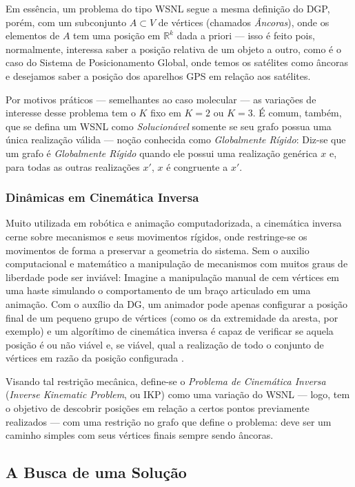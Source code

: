 Em essência, um problema do tipo WSNL segue a mesma definição do DGP, porém, com um subconjunto $A\subset V$ de vértices (chamados \textit{Âncoras}), onde os elementos de $A$ tem uma posição em $\mathbb{R}^k$ dada a priori --- isso é feito pois, normalmente, interessa saber a posição relativa de um objeto a outro, como é o caso do Sistema de Posicionamento Global, onde temos os satélites como âncoras e desejamos saber a posição dos aparelhos GPS em relação aos satélites.

Por motivos práticos --- semelhantes ao caso molecular --- as variações de interesse desse problema tem o $K$ fixo em $K= 2$ ou $K=3$. É comum, também, que se defina um WSNL como \textit{Solucionável} somente se seu grafo possua uma única realização válida --- noção conhecida como \textit{Globalmente Rígido}: Diz-se que um grafo é \textit{Globalmente Rígido} quando ele possui uma realização genérica $x$ e, para todas as outras realizações $x'$, $x$ é congruente a $x'$. 

\subsubsection{Dinâmicas em Cinemática Inversa}

Muito utilizada em robótica e animação computadorizada, a cinemática inversa cerne sobre mecanismos e seus movimentos rígidos, onde restringe-se os movimentos de forma a preservar a geometria do sistema. Sem o auxilio computacional e matemático a manipulação de mecanismos com muitos graus de liberdade  pode ser inviável: Imagine a manipulação manual de cem vértices em uma haste simulando o comportamento de um braço articulado em uma animação. Com o auxílio da DG, um animador pode apenas configurar a posição final de um pequeno grupo de vértices (como os da extremidade da aresta, por exemplo) e um algorítimo de cinemática inversa é capaz de verificar se aquela posição é ou não viável e, se viável, qual a realização de todo o conjunto de vértices em razão da posição configurada \cite{cinematicaInversa}.

Visando tal restrição mecânica, define-se o \textit{Problema de Cinemática Inversa} (\textit{Inverse Kinematic Problem}, ou IKP) como uma variação do WSNL --- logo, tem o objetivo de descobrir posições em relação a certos pontos previamente realizados --- com uma restrição no grafo que define o problema: deve ser um caminho simples com seus vértices finais sempre sendo âncoras.

\subsection{A Busca de uma Solução}


